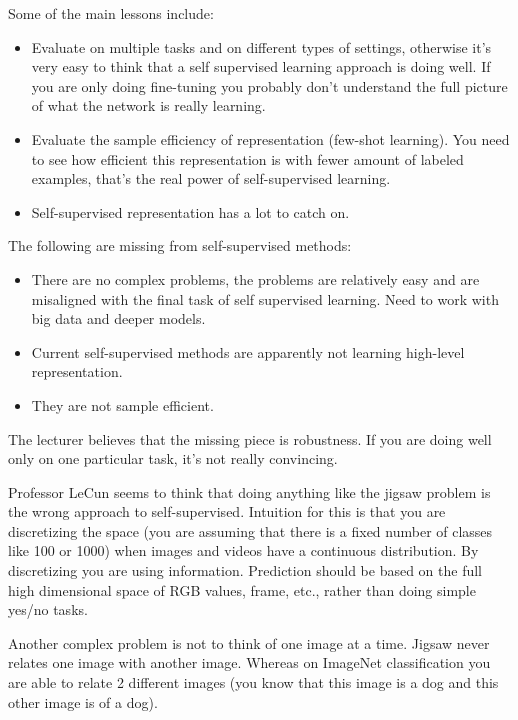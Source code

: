 Some of the main lessons include:
\begin{itemize}
\item Evaluate on multiple tasks and on different types of settings, otherwise it’s very easy to think that a self supervised learning approach is doing well. If you are only doing fine-tuning you probably don’t understand the full picture of what the network is really learning.
\item Evaluate the sample efficiency of representation (few-shot learning). You need to see how efficient this representation is with fewer amount of labeled examples, that’s the real power of self-supervised learning.
\item Self-supervised representation has a lot to catch on.
\end{itemize}
The following are missing from self-supervised methods:
\begin{itemize}
\item There are no complex problems, the problems are relatively easy and are misaligned with the final task of self supervised learning. Need to work with big data and deeper models.
\item Current self-supervised methods are apparently not learning high-level representation.
\item They are not sample efficient.
\end{itemize}

The lecturer believes that the missing piece is robustness. If you are doing well only on one particular task, it’s not really convincing.

Professor LeCun seems to think that doing anything like the jigsaw problem is the wrong approach to self-supervised. Intuition for this is that you are discretizing the space (you are assuming that there is a fixed number of classes like 100 or 1000) when images and videos have a continuous distribution. By discretizing you are using information. Prediction should be based on the full high dimensional space of RGB values, frame, etc., rather than doing simple yes/no tasks.

Another complex problem is not to think of one image at a time. Jigsaw never relates one image with another image. Whereas on ImageNet classification you are able to relate 2 different images (you know that this image is a dog and this other image is of a dog).

